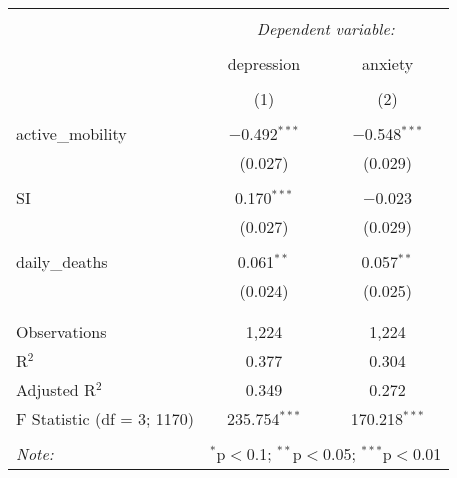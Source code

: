 
\begin{table}[!htbp] \centering 
  \caption{} 
  \label{} 
\begin{tabular}{@{\extracolsep{5pt}}lcc} 
\\[-1.8ex]\hline 
\hline \\[-1.8ex] 
 & \multicolumn{2}{c}{\textit{Dependent variable:}} \\ 
\cline{2-3} 
\\[-1.8ex] & depression & anxiety \\ 
\\[-1.8ex] & (1) & (2)\\ 
\hline \\[-1.8ex] 
 active\_mobility & $-$0.492$^{***}$ & $-$0.548$^{***}$ \\ 
  & (0.027) & (0.029) \\ 
  & & \\ 
 SI & 0.170$^{***}$ & $-$0.023 \\ 
  & (0.027) & (0.029) \\ 
  & & \\ 
 daily\_deaths & 0.061$^{**}$ & 0.057$^{**}$ \\ 
  & (0.024) & (0.025) \\ 
  & & \\ 
\hline \\[-1.8ex] 
Observations & 1,224 & 1,224 \\ 
R$^{2}$ & 0.377 & 0.304 \\ 
Adjusted R$^{2}$ & 0.349 & 0.272 \\ 
F Statistic (df = 3; 1170) & 235.754$^{***}$ & 170.218$^{***}$ \\ 
\hline 
\hline \\[-1.8ex] 
\textit{Note:}  & \multicolumn{2}{r}{$^{*}$p$<$0.1; $^{**}$p$<$0.05; $^{***}$p$<$0.01} \\ 
\end{tabular} 
\end{table} 
